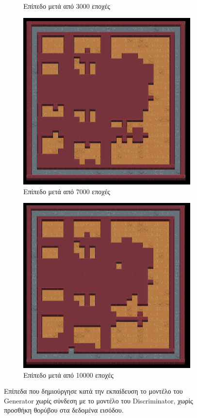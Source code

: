 \begin{figure}[H]
\begin{subfigure}{.5\textwidth}
  \caption{Επίπεδο μετά από 3000 εποχές}
  \label{fig:sfig2}
\end{subfigure}
\begin{subfigure}{.5\textwidth}
  \centering
  \includegraphics[width=.8\linewidth]{../images/result_images/cnn-gan/generator_7000.png}
  \caption{Επίπεδο μετά από 7000 εποχές}
  \label{fig:sfig2}
\end{subfigure}
\begin{subfigure}{.5\textwidth}
  \centering
  \includegraphics[width=.8\linewidth]{../images/result_images/cnn-gan/generator_10000.png}
  \caption{Επίπεδο μετά από 10000 εποχές}
  \label{fig:sfig2}
\end{subfigure}
\caption{Επίπεδα που δημιούργησε κατά την εκπαίδευση το μοντέλο του Generator χωρίς σύνδεση με το μοντέλο του Discriminator, χωρίς προσθήκη θορύβου στα δεδομένα εισόδου.}
\label{fig:fig}
\end{figure}

